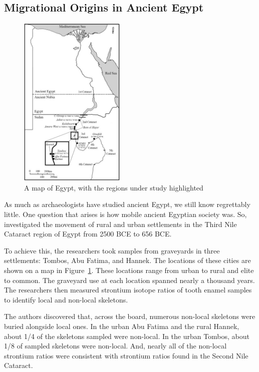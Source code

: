 \documentclass[a4paper, 12pt]{article}
\begin{document}
\subsection{Migrational Origins in Ancient Egypt}
\begin{figure}[ht]
    \centering
    \includegraphics[width=0.45\textwidth]{egypt_regions.jpg}
    \caption{A map of Egypt, with the regions under study highlighted \citep{schrader2019} }
    \label{fig:egypt_regions}
\end{figure}

As much as archaeologists have studied ancient Egypt, we still know regrettably little.
One question that arises is how mobile ancient Egyptian society was.
So, \cite{schrader2019} investigated the movement of rural and urban settlements
in the Third Nile Cataract region of Egypt from 2500 BCE to 656 BCE.

To achieve this, the researchers took samples from graveyards in three settlements:
Tombos, Abu Fatima, and Hannek. The locations of these cities are shown on a map
in Figure~\ref{fig:egypt_regions}. These locations range from urban to rural and elite
to common. The
graveyard use at each location spanned nearly a thousand years. The researchers
then measured strontium isotope ratios of tooth enamel samples to
identify local and non-local skeletons.

The authors discovered that, across the board, numerous non-local skeletons were buried
alongside local ones. In the urban Abu Fatima and the rural Hannek, about 1/4 of
the skeletons sampled were non-local. In the urban Tombos, about 1/8 of sampled
skeletons were non-local. And, nearly all of the
non-local strontium ratios were consistent with strontium ratios found in the Second
Nile Cataract.
\end{document}
